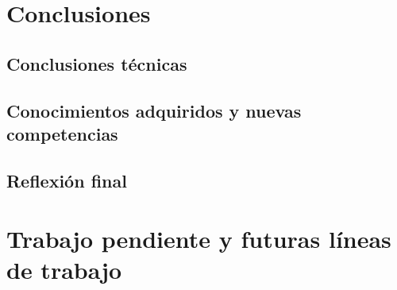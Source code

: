 \chapter{Conclusiones}\label{chap:conclussions}
\section{Conclusiones técnicas}
\section{Conocimientos adquiridos y nuevas competencias}
\section{Reflexión final}

\chapter{Trabajo pendiente y futuras líneas de trabajo}\label{chap:pending-work}
